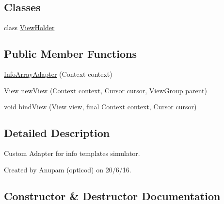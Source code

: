 \subsection*{Classes}
\begin{DoxyCompactItemize}
\item 
class \hyperlink{classorg_1_1buildmlearn_1_1toolkit_1_1infotemplate_1_1adapter_1_1InfoArrayAdapter_1_1ViewHolder}{View\+Holder}
\end{DoxyCompactItemize}
\subsection*{Public Member Functions}
\begin{DoxyCompactItemize}
\item 
\hyperlink{classorg_1_1buildmlearn_1_1toolkit_1_1infotemplate_1_1adapter_1_1InfoArrayAdapter_a3ad3262eae3b95e32998c3f1d0470b84}{Info\+Array\+Adapter} (Context context)
\item 
View \hyperlink{classorg_1_1buildmlearn_1_1toolkit_1_1infotemplate_1_1adapter_1_1InfoArrayAdapter_a167eb7d7629c9582f2fbddbd52d89bc0}{new\+View} (Context context, Cursor cursor, View\+Group parent)
\item 
void \hyperlink{classorg_1_1buildmlearn_1_1toolkit_1_1infotemplate_1_1adapter_1_1InfoArrayAdapter_a3d45e51c33d7659d2bceb9afd0ae5e17}{bind\+View} (View view, final Context context, Cursor cursor)
\end{DoxyCompactItemize}


\subsection{Detailed Description}
Custom Adapter for info template\textquotesingle{}s simulator. 

Created by Anupam (opticod) on 20/6/16. 

\subsection{Constructor \& Destructor Documentation}
